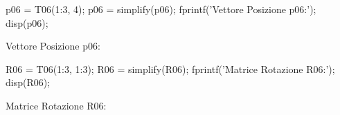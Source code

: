 \documentclass[11pt, a4paper]{article}
\begin{document}
\begin{matlabcode}
p06 = T06(1:3, 4);
p06 = simplify(p06);
fprintf('Vettore Posizione p06:\n');
disp(p06);
\end{matlabcode}
\begin{matlaboutput}
Vettore Posizione p06:
\end{matlaboutput}
\begin{matlabsymbolicoutput}
\end{matlabsymbolicoutput}
\begin{matlabcode}

R06 = T06(1:3, 1:3);
R06 = simplify(R06);
fprintf('Matrice Rotazione R06:\n');
disp(R06);
\end{matlabcode}
\begin{matlaboutput}
Matrice Rotazione R06:
\end{matlaboutput}
\end{document}
